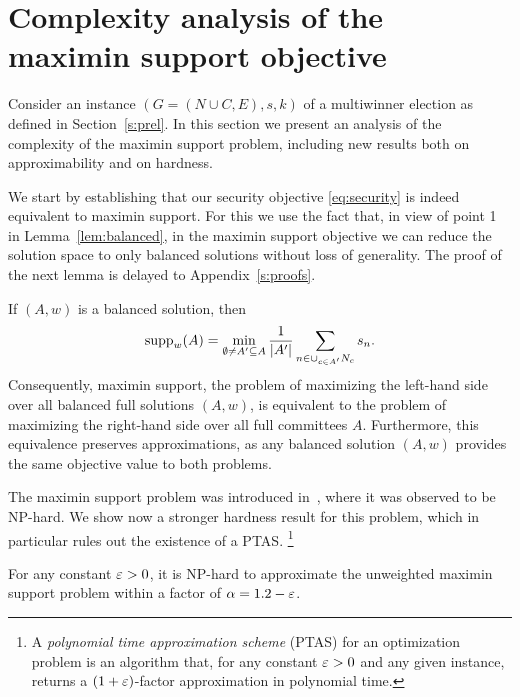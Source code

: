 \section{Complexity analysis of the maximin support objective}\label{s:complexity}

Consider an instance $(G=(N\cup C, E), s, k)$ of a multiwinner election as defined in Section~\ref{s:prel}. 
In this section we present an analysis of the complexity of the maximin support problem, including new results both on approximability and on hardness. 

We start by establishing that our security objective \eqref{eq:security} is indeed equivalent to maximin support.
For this we use the fact that, in view of point 1 in Lemma~\ref{lem:balanced}, in the maximin support objective we can reduce the solution space to only balanced solutions without loss of generality. 
The proof of the next lemma is delayed to Appendix~\ref{s:proofs}.

\begin{lemma} \label{lem:equivalence} 
If $(A,w)$ is a balanced solution, then
$$\operatorname{supp}_w(A) = \min_{\emptyset\neq A' \subseteq A} \frac{1}{|A'|} \sum_{n\in \cup_{c\in A'} N_c} s_n.$$
Consequently, maximin support, the problem of maximizing the left-hand side over all balanced full solutions $(A,w)$, 
is equivalent to the problem of maximizing the right-hand side over all full committees $A$. 
Furthermore, this equivalence preserves approximations, as any balanced solution $(A,w)$ provides the same objective value to both problems.
\end{lemma}

The maximin support problem was introduced in~\cite{sanchez2016maximin}, where it was observed to be NP-hard. We show now a stronger hardness result for this problem, which in particular rules out the existence of a PTAS.%
\footnote{A \emph{polynomial time approximation scheme} (PTAS) for an optimization problem is an algorithm that, for any constant $\varepsilon>0$ and any given instance, returns a $(1+\varepsilon)$-factor approximation in polynomial time.} 


\begin{lemma}\label{lem:hardness}
For any constant $\varepsilon>0$, it is NP-hard to approximate the unweighted maximin support problem within a factor of $\alpha=1.2-\varepsilon$.
\end{lemma}

